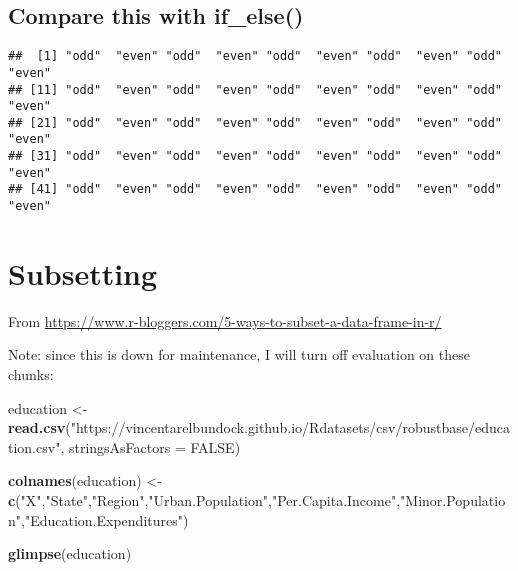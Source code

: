 \documentclass[]{book}
\newenvironment{Shaded}{\begin{snugshade}}{\end{snugshade}}
\newcommand{\DataTypeTok}[1]{\textcolor[rgb]{0.13,0.29,0.53}{#1}}
\newcommand{\DecValTok}[1]{\textcolor[rgb]{0.00,0.00,0.81}{#1}}
\newcommand{\KeywordTok}[1]{\textcolor[rgb]{0.13,0.29,0.53}{\textbf{#1}}}
\newcommand{\NormalTok}[1]{#1}
\newcommand{\OperatorTok}[1]{\textcolor[rgb]{0.81,0.36,0.00}{\textbf{#1}}}
\newcommand{\OtherTok}[1]{\textcolor[rgb]{0.56,0.35,0.01}{#1}}
\newcommand{\StringTok}[1]{\textcolor[rgb]{0.31,0.60,0.02}{#1}}
\begin{document}
\hypertarget{compare-this-with-if_else}{%
\section{Compare this with if\_else()}\label{compare-this-with-if_else}}

\begin{Shaded}
\end{Shaded}

\begin{verbatim}
##  [1] "odd"  "even" "odd"  "even" "odd"  "even" "odd"  "even" "odd"  "even"
## [11] "odd"  "even" "odd"  "even" "odd"  "even" "odd"  "even" "odd"  "even"
## [21] "odd"  "even" "odd"  "even" "odd"  "even" "odd"  "even" "odd"  "even"
## [31] "odd"  "even" "odd"  "even" "odd"  "even" "odd"  "even" "odd"  "even"
## [41] "odd"  "even" "odd"  "even" "odd"  "even" "odd"  "even" "odd"  "even"
\end{verbatim}

\hypertarget{subset}{%
\chapter{Subsetting}\label{subset}}

From \url{https://www.r-bloggers.com/5-ways-to-subset-a-data-frame-in-r/}

Note: since this is down for maintenance, I will turn off evaluation on these chunks:

\begin{Shaded}
\begin{Highlighting}[]
\NormalTok{education <-}\StringTok{ }\KeywordTok{read.csv}\NormalTok{(}\StringTok{"https://vincentarelbundock.github.io/Rdatasets/csv/robustbase/education.csv"}\NormalTok{, }\DataTypeTok{stringsAsFactors =} \OtherTok{FALSE}\NormalTok{)}

\KeywordTok{colnames}\NormalTok{(education) <-}\StringTok{ }\KeywordTok{c}\NormalTok{(}\StringTok{"X"}\NormalTok{,}\StringTok{"State"}\NormalTok{,}\StringTok{"Region"}\NormalTok{,}\StringTok{"Urban.Population"}\NormalTok{,}\StringTok{"Per.Capita.Income"}\NormalTok{,}\StringTok{"Minor.Population"}\NormalTok{,}\StringTok{"Education.Expenditures"}\NormalTok{)}

\KeywordTok{glimpse}\NormalTok{(education)}
\end{Highlighting}
\end{Shaded}
\end{document}

